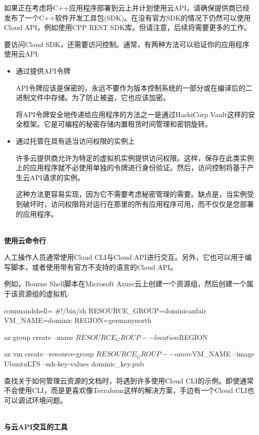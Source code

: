 如果正在考虑将C++应用程序部署到云上并计划使用云API，请确保提供商已经发布了一个C++软件开发工具包(SDK)。在没有官方SDK的情况下仍然可以使用Cloud API，例如使用CPP REST SDK库。但请注意，后续将需要更多的工作。 

要访问Cloud SDK，还需要访问控制。通常，有两种方法可以验证你的应用程序使用云API:

\begin{itemize}
\item 
通过提供API令牌

API令牌应该是保密的，永远不要作为版本控制系统的一部分或在编译后的二进制文件中存储。为了防止被盗，它也应该加密。

将API令牌安全地传递给应用程序的方法之一是通过HashiCorp Vault这样的安全框架。它是可编程的秘密存储内置租赁时间管理和密钥旋转。

\item 
通过托管在具有适当访问权限的实例上

许多云提供商允许为特定的虚拟机实例提供访问权限。这样，保存在此类实例上的应用程序就不必使用单独的令牌进行身份验证。然后，访问控制将基于产生云API请求的实例。

这种方法更容易实现，因为它不需要考虑秘密管理的需要。缺点是，当实例受到破坏时，访问权限将对运行在那里的所有应用程序可用，而不仅仅是您部署的应用程序。
\end{itemize}

\hspace*{\fill} \\ %
\noindent
\textbf{使用云命令行}

人工操作人员通常使用Cloud CLI与Cloud API进行交互。另外，它也可以用于编写脚本，或者使用带有官方不支持的语言的Cloud API。

例如，Bourne Shell脚本在Microsoft Azure云上创建一个资源组，然后创建一个属于该资源组的虚拟机:

\begin{tcblisting}{commandshell={}}
#!/bin/sh
RESOURCE_GROUP=dominicanfair
VM_NAME=dominic
REGION=germanynorth

az group create --name $RESOURCE_GROUP --location $REGION

az vm create --resource-group $RESOURCE_GROUP --name $VM_NAME --image
UbuntuLTS --ssh-key-values dominic_key.pub
\end{tcblisting}

查找关于如何管理云资源的文档时，将遇到许多使用Cloud CLI的示例。即使通常不会使用CLI，而是更喜欢像Terraform这样的解决方案，手边有一个Cloud CLI也可以调试环境问题。

\hspace*{\fill} \\ %
\noindent
\textbf{与云API交互的工具}

